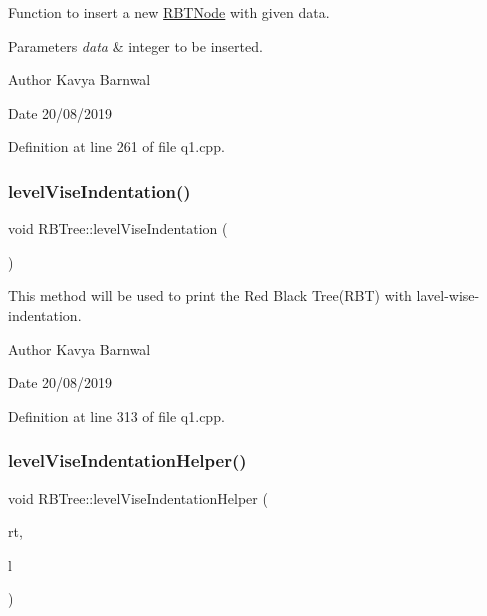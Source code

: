 Function to insert a new \hyperlink{struct_r_b_t_node}{R\+B\+T\+Node} with given data. 
\begin{DoxyParams}{Parameters}
{\em data} & integer to be inserted. \\
\hline
\end{DoxyParams}
\begin{DoxyAuthor}{Author}
Kavya Barnwal 
\end{DoxyAuthor}
\begin{DoxyDate}{Date}
20/08/2019 
\end{DoxyDate}


Definition at line 261 of file q1.\+cpp.

\mbox{\label{class_r_b_tree_addb32f82fc392201f9b8d6f3aaddb382}} 
\subsubsection{\texorpdfstring{level\+Vise\+Indentation()}{levelViseIndentation()}}
{\footnotesize\ttfamily void R\+B\+Tree\+::level\+Vise\+Indentation (\begin{DoxyParamCaption}{ }\end{DoxyParamCaption})\hspace{0.3cm}{\ttfamily [inline]}}

This method will be used to print the Red Black Tree(\+R\+B\+T) with lavel-\/wise-\/indentation. \begin{DoxyAuthor}{Author}
Kavya Barnwal 
\end{DoxyAuthor}
\begin{DoxyDate}{Date}
20/08/2019 
\end{DoxyDate}


Definition at line 313 of file q1.\+cpp.

\mbox{\label{class_r_b_tree_a3c9ae2993698192390a17a57df86febc}} 
\subsubsection{\texorpdfstring{level\+Vise\+Indentation\+Helper()}{levelViseIndentationHelper()}}
{\footnotesize\ttfamily void R\+B\+Tree\+::level\+Vise\+Indentation\+Helper (\begin{DoxyParamCaption}\item[{\hyperlink{struct_r_b_t_node}{R\+B\+T\+Node} $\ast$}]{rt,  }\item[{int}]{l }\end{DoxyParamCaption})\hspace{0.3cm}{\ttfamily [inline]}}

